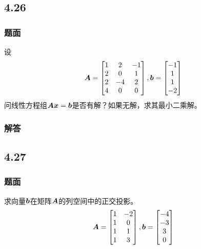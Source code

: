 \documentclass{beamer}
\begin{document}
\subsection*{4.26}
\begin{frame}
    \frametitle{题面}

    设
    \begin{equation*}
        \boldsymbol{A}=
        \begin{bmatrix}
            1 & 2  & -1 \\
            2 & 0  & 1  \\
            2 & -4 & 2  \\
            4 & 0  & 0
        \end{bmatrix},
        \boldsymbol{b}=\begin{bmatrix}-1\\1\\1\\-2\end{bmatrix}
    \end{equation*}
    问线性方程组\(\boldsymbol{A}\boldsymbol{x}=\boldsymbol{b}\)是否有解？如果无解，求其最小二乘解。

\end{frame}

\begin{frame}
    \frametitle{解答}



\end{frame}

\subsection*{4.27}
\begin{frame}
    \frametitle{题面}

    求向量\(\boldsymbol{b}\)在矩阵\(\boldsymbol{A}\)的列空间中的正交投影。
    \begin{equation*}
        \boldsymbol{A}=
        \begin{bmatrix}
            1 & -2 \\
            1 & 0  \\
            1 & 1  \\
            1 & 3
        \end{bmatrix},
        \boldsymbol{b}=\begin{bmatrix}-4\\-3\\3\\0\end{bmatrix}
    \end{equation*}

\end{frame}
\end{document}
